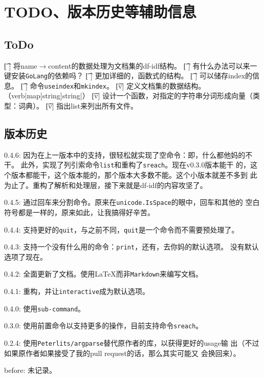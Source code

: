 \section{TODO、版本历史等辅助信息}

\subsection{ToDo}
\begin{plttodoenv}{1}
    \t[ ] 将name$\to$content的数据处理为文档集的df-idf结构。
    \t[ ] 有什么办法可以来一键安装\verb|GoLang|的依赖吗？
    \t[ ] 更加详细的，函数式的结构。
    \t[ ] 可以储存index的信息。
    \t[ ] 命令\verb|useindex|和\verb|mkindex|。
    \t[v] 定义文档集的数据结构。（verb|map[string]string|）
    \t[v] 设计一个函数，对指定的字符串分词形成向量（类型：词典）。
    \t[v] 指出list来列出所有文件。
\end{plttodoenv}
\bigskip

\subsection{版本历史}

\hline

0.4.6: 因为在上一版本中的支持，很轻松就实现了空命令：即，什么都他妈的不干。
此外，实现了列引索命令\verb|list|和重构了\verb|sreach|。现在v0.3.0版本能干
的，这个版本都能干，这个版本能的，那个版本大多数不能。这个小版本就差不多到
此为止了。重构了解析和处理层，接下来就是df-idf的内容攻坚了。

0.4.5: 通过回车来分割命令。原来在\verb|unicode.IsSpace|的眼中，回车和其他的
空白符号都是一样的，原来如此，让我搞得好辛苦。

0.4.4: 支持更好的\verb|quit|，与之前不同，\verb|quit|是一个命令而不需要预处理了。

0.4.3: 支持一个没有什么用的命令：\verb|print|，还有，去你妈的默认选项。
没有默认选项了现在。

0.4.2: 全面更新了文档。使用\LaTeX{}而非\verb|Markdown|来编写文档。

0.4.1: 重构，并让\verb|interactive|成为默认选项。

0.4.0: 使用\verb|sub-command|。

\hline

0.3.0: 使用前置命令以支持更多的操作，目前支持命令\verb|sreach|。

\hline

0.2.4: 使用\verb|Peterlits/argparse|替代原作者的库，以获得更好的usage输
出（不过如果原作者如果接受了我的pull request的话，那么其实可能又
会换回来）。

\hline

before: 未记录。

